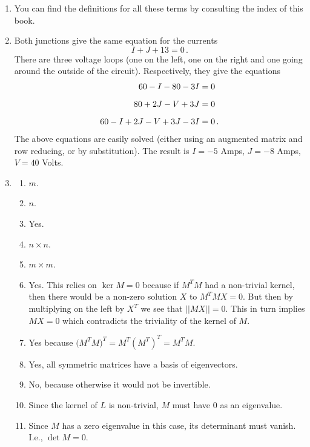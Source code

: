 \begin{enumerate}
\item You can find the definitions for all these terms by consulting the index of this book.

\item Both junctions give the same equation for the currents
\[
I+J+13=0\, .
\]
There are three voltage loops (one on the left, one on the right and one going around the outside of the circuit). Respectively, they give the equations
\begin{align}
60-I-80-3I=0&\nonumber\\[2mm]
80+2J-V+3J=0&\nonumber\\[2mm]
60-I+2J-V+3J-3I=0&\, .
\end{align}
The above equations are easily solved (either using an augmented matrix and row reducing, or by substitution). The result is $I=-5$ Amps, $J=-8$ Amps, $V=40$ Volts.



\item 
\begin{enumerate}
\item $m$.
\item $n$.
\item Yes.
\item $n\times n$.
\item $m\times m$.
\item Yes. This relies on $\ker M=0$ because if $M^T M$ had a non-trivial kernel, then there would be a non-zero solution $X$ to $M^T M X=0$. But then by multiplying on the left by $X^T$ we see that $||MX||=0$. This in turn implies $MX=0$ which contradicts the triviality of the kernel of $M$. 
\item Yes because $\big(M^T M\big)^T=M^T (M^T)^T=M^T M$.
\item Yes, all symmetric matrices have a basis of eigenvectors.
\item No, because otherwise it would not be invertible.
\item Since the kernel of $L$ is non-trivial, $M$ must have $0$ as an eigenvalue.
\item Since $M$ has a zero eigenvalue in this case, its determinant must vanish. {I.e.}, $\det M=0$.
\end{enumerate}


\end{enumerate}
